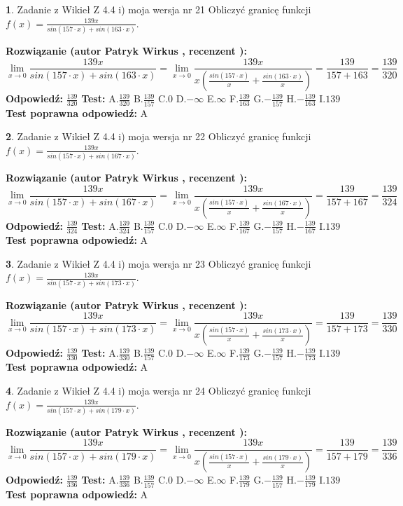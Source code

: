 \documentclass[12pt, a4paper]{article}
\theoremstyle{definition} %
\newtheorem{zad}{}
\newcommand{\zadStart}[1]{\begin{zad}#1\newline}
\newcommand{\zadStop}{\end{zad}}
\newcommand{\rozwStart}[2]{\noindent \textbf{Rozwiązanie (autor #1 , recenzent #2): }\newline}
\newcommand{\rozwStop}{\newline}
\newcommand{\odpStart}{\noindent \textbf{Odpowiedź:}\newline}
\newcommand{\odpStop}{\newline}
\newcommand{\testStart}{\noindent \textbf{Test:}\newline}
\newcommand{\testStop}{\newline}
\newcommand{\kluczStart}{\noindent \textbf{Test poprawna odpowiedź:}\newline}
\newcommand{\kluczStop}{\newline}
\begin{document}
\zadStart{Zadanie z Wikieł Z 4.4 i) moja wersja nr 21}
Obliczyć granicę funkcji $f(x)=\frac{139x}{sin(157\cdot x) +sin(163\cdot x)}$.
\zadStop
\rozwStart{Patryk Wirkus}{}
$$\lim\limits_{x\to 0}\frac{139x}{sin(157\cdot x) +sin(163\cdot x)}=\lim\limits_{x\to 0}\frac{139x}{x(\frac{sin(157\cdot x)}{x}+\frac{sin(163\cdot x)}{x})}=\frac{139}{157+163} = \frac{139}{320}$$
\rozwStop
\odpStart
$\frac{139}{320}$
\odpStop
\testStart
A.$\frac{139}{320}$
B.$\frac{139}{157}$
C.$0$
D.$-\infty$
E.$\infty$
F.$\frac{139}{163}$
G.$-\frac{139}{157}$
H.$-\frac{139}{163}$
I.$139$
\testStop
\kluczStart
A
\kluczStop



\zadStart{Zadanie z Wikieł Z 4.4 i) moja wersja nr 22}
Obliczyć granicę funkcji $f(x)=\frac{139x}{sin(157\cdot x) +sin(167\cdot x)}$.
\zadStop
\rozwStart{Patryk Wirkus}{}
$$\lim\limits_{x\to 0}\frac{139x}{sin(157\cdot x) +sin(167\cdot x)}=\lim\limits_{x\to 0}\frac{139x}{x(\frac{sin(157\cdot x)}{x}+\frac{sin(167\cdot x)}{x})}=\frac{139}{157+167} = \frac{139}{324}$$
\rozwStop
\odpStart
$\frac{139}{324}$
\odpStop
\testStart
A.$\frac{139}{324}$
B.$\frac{139}{157}$
C.$0$
D.$-\infty$
E.$\infty$
F.$\frac{139}{167}$
G.$-\frac{139}{157}$
H.$-\frac{139}{167}$
I.$139$
\testStop
\kluczStart
A
\kluczStop



\zadStart{Zadanie z Wikieł Z 4.4 i) moja wersja nr 23}
Obliczyć granicę funkcji $f(x)=\frac{139x}{sin(157\cdot x) +sin(173\cdot x)}$.
\zadStop
\rozwStart{Patryk Wirkus}{}
$$\lim\limits_{x\to 0}\frac{139x}{sin(157\cdot x) +sin(173\cdot x)}=\lim\limits_{x\to 0}\frac{139x}{x(\frac{sin(157\cdot x)}{x}+\frac{sin(173\cdot x)}{x})}=\frac{139}{157+173} = \frac{139}{330}$$
\rozwStop
\odpStart
$\frac{139}{330}$
\odpStop
\testStart
A.$\frac{139}{330}$
B.$\frac{139}{157}$
C.$0$
D.$-\infty$
E.$\infty$
F.$\frac{139}{173}$
G.$-\frac{139}{157}$
H.$-\frac{139}{173}$
I.$139$
\testStop
\kluczStart
A
\kluczStop



\zadStart{Zadanie z Wikieł Z 4.4 i) moja wersja nr 24}
Obliczyć granicę funkcji $f(x)=\frac{139x}{sin(157\cdot x) +sin(179\cdot x)}$.
\zadStop
\rozwStart{Patryk Wirkus}{}
$$\lim\limits_{x\to 0}\frac{139x}{sin(157\cdot x) +sin(179\cdot x)}=\lim\limits_{x\to 0}\frac{139x}{x(\frac{sin(157\cdot x)}{x}+\frac{sin(179\cdot x)}{x})}=\frac{139}{157+179} = \frac{139}{336}$$
\rozwStop
\odpStart
$\frac{139}{336}$
\odpStop
\testStart
A.$\frac{139}{336}$
B.$\frac{139}{157}$
C.$0$
D.$-\infty$
E.$\infty$
F.$\frac{139}{179}$
G.$-\frac{139}{157}$
H.$-\frac{139}{179}$
I.$139$
\testStop
\kluczStart
A
\kluczStop
\end{document}
